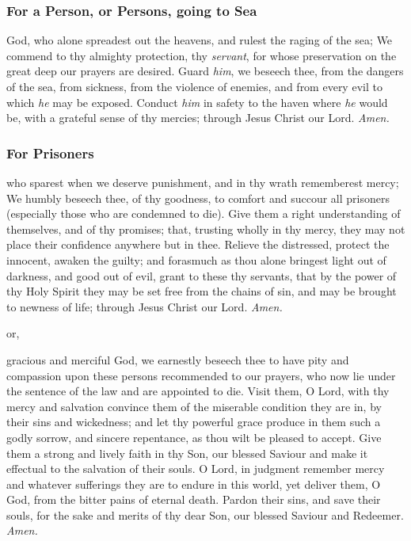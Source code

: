 \subsubsection{For a Person, or Persons, going to Sea}
 God, who alone spreadest out the heavens, and rulest the raging of the sea; We commend to thy almighty protection, thy \textit{servant}, for whose preservation on the great deep our prayers are desired. Guard \textit{him}, we beseech thee, from the dangers of the sea, from sickness, from the violence of enemies, and from every evil to which \textit{he} may be exposed. Conduct \textit{him} in safety to the haven where \textit{he} would be, with a grateful sense of thy mercies; through Jesus Christ our Lord. \textit{Amen.}

\subsubsection{For Prisoners}
 who sparest when we deserve punishment, and in thy wrath rememberest mercy; We humbly beseech thee, of thy goodness, to comfort and succour all prisoners (especially those who are condemned to die). Give them a right understanding of themselves, and of thy promises; that, trusting wholly in thy mercy, they may not place their confidence anywhere but in thee. Relieve the distressed, protect the innocent, awaken the guilty; and forasmuch as thou alone bringest light out of darkness, and good out of evil, grant to these thy servants, that by the power of thy Holy Spirit they may be set free from the chains of sin, and may be brought to newness of life; through Jesus Christ our Lord. \textit{Amen.}
\begin{inhead}
    or,
\end{inhead}
 gracious and merciful God, we earnestly beseech thee to have pity and compassion upon these persons recommended to our prayers, who now lie under the sentence of the law and are appointed to die. Visit them, O Lord, with thy mercy and salvation convince them of the miserable condition they are in, by their sins and wickedness; and let thy powerful grace produce in them such a godly sorrow, and sincere repentance, as thou wilt be pleased to accept. Give them a strong and lively faith in thy Son, our blessed Saviour and make it effectual to the salvation of their souls. O Lord, in judgment remember mercy and whatever sufferings they are to endure in this world, yet deliver them, O God, from the bitter pains of eternal death. Pardon their sins, and save their souls, for the sake and merits of thy dear Son, our blessed Saviour and Redeemer. \textit{Amen.}



